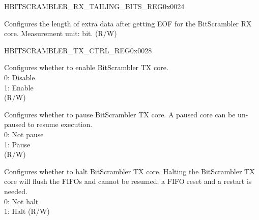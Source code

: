 \begin{register}{H}{BITSCRAMBLER\_RX\_TAILING\_BITS\_REG}{0x0024}\label{regdesc:BITSCRAMBLERRXTAILINGBITSREG}
%
%
\regnewline%
\begin{regdesc}\begin{reglist}
\label{fielddesc:BITSCRAMBLERRXTAILINGBITS}\item [BITSCRAMBLER\_RX\_TAILING\_BITS] Configures the length of extra data after getting EOF for the BitScrambler RX core. Measurement unit: bit. (R/W)
\end{reglist}\end{regdesc}
\end{register}


\begin{register}{H}{BITSCRAMBLER\_TX\_CTRL\_REG}{0x0028}\label{regdesc:BITSCRAMBLERTXCTRLREG}
%
%
%
%
%
%
%
%
%
%
\regnewline%
\begin{regdesc}\begin{reglist}
\label{fielddesc:BITSCRAMBLERTXENA}\item [BITSCRAMBLER\_TX\_ENA] Configures whether to enable BitScrambler TX core. \\0: Disable\\1: Enable\\(R/W)
\label{fielddesc:BITSCRAMBLERTXPAUSE}\item [BITSCRAMBLER\_TX\_PAUSE] Configures whether to pause BitScrambler TX core. A paused core can be un-paused to resume execution. \\0: Not pause\\1: Pause\\(R/W)
\label{fielddesc:BITSCRAMBLERTXHALT}\item [BITSCRAMBLER\_TX\_HALT] Configures whether to halt BitScrambler TX core. Halting the BitScrambler TX core will flush the FIFOs and cannot be resumed; a FIFO reset and a restart is needed. \\0: Not halt\\1: Halt (R/W)

\end{reglist}
\end{regdesc}
\end{register}
